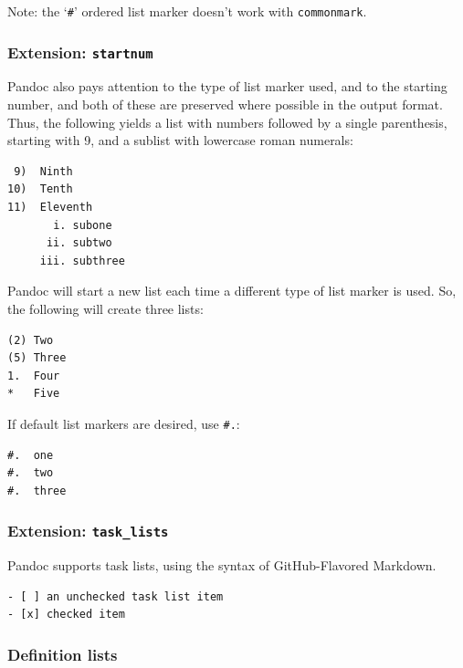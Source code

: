 \documentclass[
]{article}
\begin{document}
Note: the `\texttt{\#}' ordered list marker doesn't work with
\texttt{commonmark}.

\hypertarget{extension-startnum}{%
\subsubsection{\texorpdfstring{Extension:
\texttt{startnum}}{Extension: startnum}}\label{extension-startnum}}

Pandoc also pays attention to the type of list marker used, and to the
starting number, and both of these are preserved where possible in the
output format. Thus, the following yields a list with numbers followed
by a single parenthesis, starting with 9, and a sublist with lowercase
roman numerals:

\begin{verbatim}
 9)  Ninth
10)  Tenth
11)  Eleventh
       i. subone
      ii. subtwo
     iii. subthree
\end{verbatim}

Pandoc will start a new list each time a different type of list marker
is used. So, the following will create three lists:

\begin{verbatim}
(2) Two
(5) Three
1.  Four
*   Five
\end{verbatim}

If default list markers are desired, use \texttt{\#.}:

\begin{verbatim}
#.  one
#.  two
#.  three
\end{verbatim}

\hypertarget{extension-task_lists}{%
\subsubsection{\texorpdfstring{Extension:
\texttt{task\_lists}}{Extension: task\_lists}}\label{extension-task_lists}}

Pandoc supports task lists, using the syntax of GitHub-Flavored
Markdown.

\begin{verbatim}
- [ ] an unchecked task list item
- [x] checked item
\end{verbatim}

\hypertarget{definition-lists}{%
\subsubsection{Definition lists}\label{definition-lists}}
\end{document}
